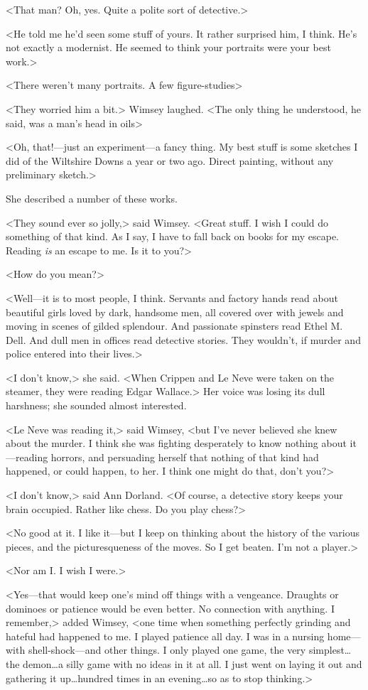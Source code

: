 <That man? Oh, yes. Quite a polite sort of detective.>

<He told me he'd seen some stuff of yours. It rather surprised him, I think. He's not exactly a modernist. He seemed to think your portraits were your best work.>

<There weren't many portraits. A few figure-studies\longdots>

<They worried him a bit.> Wimsey laughed. <The only thing he understood, he said, was a man's head in oils\longdots>

<Oh, that!—just an experiment—a fancy thing. My best stuff is some sketches I did of the Wiltshire Downs a year or two ago. Direct painting, without any preliminary sketch.>

She described a number of these works.

<They sound ever so jolly,> said Wimsey. <Great stuff. I wish I could do something of that kind. As I say, I have to fall back on books for my escape. Reading \emph{is} an escape to me. Is it to you?>

<How do you mean?>

<Well—it is to most people, I think. Servants and factory hands read about beautiful girls loved by dark, handsome men, all covered over with jewels and moving in scenes of gilded splendour. And passionate spinsters read Ethel M\@. Dell. And dull men in offices read detective stories. They wouldn't, if murder and police entered into their lives.>

<I don't know,> she said. <When Crippen and Le Neve were taken on the steamer, they were reading Edgar Wallace.> Her voice was losing its dull harshness; she sounded almost interested.

<Le Neve was reading it,> said Wimsey, <but I've never believed she knew about the murder. I think she was fighting desperately to know nothing about it—reading horrors, and persuading herself that nothing of that kind had happened, or could happen, to her. I think one might do that, don't you?>

<I don't know,> said Ann Dorland. <Of course, a detective story keeps your brain occupied. Rather like chess. Do you play chess?>

<No good at it. I like it—but I keep on thinking about the history of the various pieces, and the picturesqueness of the moves. So I get beaten. I'm not a player.>

<Nor am I\@. I wish I were.>

<Yes—that would keep one's mind off things with a vengeance. Draughts or dominoes or patience would be even better. No connection with anything. I remember,> added Wimsey, <one time when something perfectly grinding and hateful had happened to me. I played patience all day. I was in a nursing home—with shell-shock—and other things. I only played one game, the very simplest\dots  the demon\dots  a silly game with no ideas in it at all. I just went on laying it out and gathering it up\dots  hundred times in an evening\dots  so as to stop thinking.>

